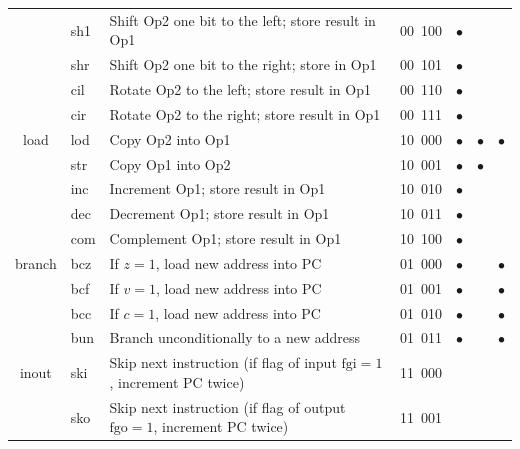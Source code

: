 \begin{table}
\begin{center}
\begin{tabular}{cllcccc}
     & sh1 & Shift Op2 one bit to the left; store result in Op1 & 00\ 100 & $\bullet$ &&\\


    & shr & Shift Op2 one bit to the right; store in Op1 & 00\ 101 & $\bullet$ &&\\


 & cil & Rotate Op2 to the left; store result in Op1 & 00\ 110 & $\bullet$\\


& cir & Rotate Op2 to the right; store result in Op1 & 00\ 111 & $\bullet$ &&\\


\hline


load & lod & Copy Op2 into Op1 & 10\ 000 & $\bullet$ & $\bullet$ & $\bullet$\\


& str & Copy Op1 into Op2 & 10\ 001 & $\bullet$ & $\bullet$ & \\


& inc & Increment Op1; store result in Op1 & 10\ 010 & $\bullet$ &&\\


 & dec & Decrement Op1; store result in Op1 & 10\ 011 & $\bullet$ &&\\


 & com & Complement Op1; store result in Op1 & 10\ 100 & $\bullet$ &&\\


\hline


branch & bcz & If $z = 1$, load new address into PC & 01\ 000 & $\bullet$ & & $\bullet$\\


& bcf & If $v = 1$, load new address into PC & 01\ 001 & $\bullet$ & & $\bullet$\\


& bcc & If $c = 1$, load new address into PC & 01\ 010 & $\bullet$ & & $\bullet$\\


& bun & Branch unconditionally to a new address & 01\ 011 &$\bullet$ & & $\bullet$\\


\hline


inout &ski & Skip next instruction (if flag of input $\mathrm{fgi} = 1$,   increment PC  twice) & 11\ 000 &&&\\


& sko &Skip next instruction (if flag of output $\mathrm{fgo} = 1$, increment PC twice) & 11\ 001 &&&\\



\end{tabular}
\end{center}
\end{table}
